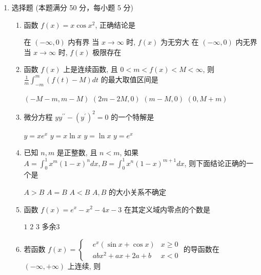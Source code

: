 

\begin{enumerate}
	\item
	选择题 (本题满分 50 分，每小题 5 分)
	\begin{enumerate}
		\item
		函数 $f(x)=x \cos x^{2}$, 正确结论是  
		
	\fourchoices
	{在 $(-\infty, 0)$ 内有界}
	{当 $x \rightarrow \infty$ 时, $f(x)$ 为无穷大}
	{在 $(-\infty, 0)$ 内无界}
	{当 $x \rightarrow \infty$ 时, $f(x)$ 极限存在}
	
\item 
函数 $f(x)$ 上是连续函数, 且 $0<m<f(x)<M<\infty$, 则 $\frac{1}{m} \int_{-m}^{m}(f(t)-M) d t$ 的最大取值区间是  


\fourchoices
{$(-M-m, m-M)$}
{$(2 m-2 M, 0)$}
{$(m-M, 0)$}
{$(0, M+m)$}


\item 
微分方程 $y y^{\prime \prime}-\left(y^{\prime}\right)^{2}=0$ 的一个特解是  


\fourchoices
{$y=x e^{x}$}
{$y=x \ln x$}
{$y=\ln x$}
{$y=e^{x}$}

\item 
已知 $n, m$ 是正整数, 且 $n<m$, 如果 $A=\int_{0}^{1} x^{m}(1-x)^{n} d x, B=\int_{0}^{1} x^{n}(1-x)^{m+1} d x$, 则下面结论正确的一个是  


\fourchoices
{$A>B$}
{$A=B$}
{$A<B$}
{$A, B$ 的大小关系不确定}

\item 
函数 $f(x)=e^{x}-x^{2}-4 x-3$ 在其定义域内零点的个数是  



\fourchoices
{$ 1 $}
{$ 2 $}
{$ 3 $}
{多余$  3 $}

\item 
若函数 $f(x)= \left\{\begin{aligned} &e^{x}(\sin x+\cos x) &   x \geqslant 0 \\ &a b x^{2}+a x+2 a+b &   x<0\end{aligned}\right.$ 的导函数在 $(-\infty,+\infty)$ 上连续, 则  



\end{enumerate}
\end{enumerate}

